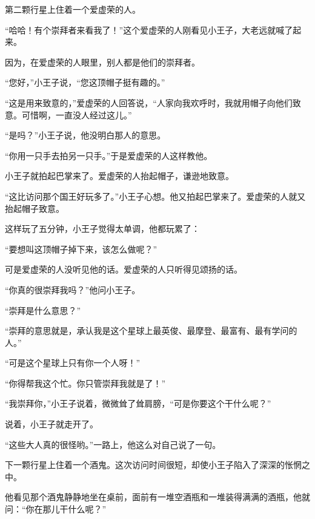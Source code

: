 \stoptitle

\starttitle[title={11},reference={part0013.html_a014}]

{\startalignment[center]
 \stopalignment}

第二颗行星上住着一个爱虚荣的人。

“哈哈！有个崇拜者来看我了！”这个爱虚荣的人刚看见小王子，大老远就喊了起来。

因为，在爱虚荣的人眼里，别人都是他们的崇拜者。

“您好，”小王子说，“您这顶帽子挺有趣的。”

“这是用来致意的，”爱虚荣的人回答说，“人家向我欢呼时，我就用帽子向他们致意。可惜啊，一直没人经过这儿。”

“是吗？”小王子说，他没明白那人的意思。

“你用一只手去拍另一只手。”于是爱虚荣的人这样教他。

小王子就拍起巴掌来了。爱虚荣的人抬起帽子，谦逊地致意。

“这比访问那个国王好玩多了。”小王子心想。他又拍起巴掌来了。爱虚荣的人就又抬起帽子致意。

这样玩了五分钟，小王子觉得太单调，他都玩累了：

“要想叫这顶帽子掉下来，该怎么做呢？”

可是爱虚荣的人没听见他的话。爱虚荣的人只听得见颂扬的话。

“你真的很崇拜我吗？”他问小王子。

“崇拜是什么意思？”

“崇拜的意思就是，承认我是这个星球上最英俊、最摩登、最富有、最有学问的人。”

“可是这个星球上只有你一个人呀！”

“你得帮我这个忙。你只管崇拜我就是了！”

“我崇拜你，”小王子说着，微微耸了耸肩膀，“可是你要这个干什么呢？”

说着，小王子就走开了。

“这些大人真的很怪哟。”一路上，他这么对自己说了一句。


\stoptitle

\starttitle[title={12},reference={part0014.html_a015}]

下一颗行星上住着一个酒鬼。这次访问时间很短，却使小王子陷入了深深的怅惘之中。

他看见那个酒鬼静静地坐在桌前，面前有一堆空酒瓶和一堆装得满满的酒瓶，他就问：“你在那儿干什么呢？”

